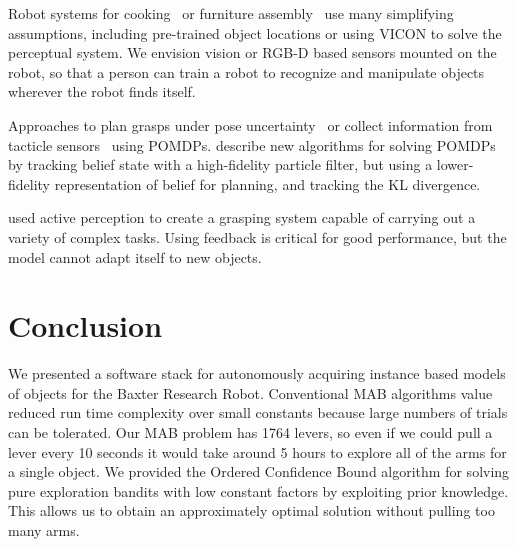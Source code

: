 \documentclass{article}
\newcommand{\stnote}[1]{\textcolor{blue}{\textbf{ST: #1}}}
\begin{document}
Robot systems for cooking~\citep{bollini12, beetz11} or furniture
assembly~\citep{knepper13} use many simplifying assumptions, including
pre-trained object locations or using VICON to solve the perceptual
system.  We envision vision or RGB-D based sensors mounted on the
robot, so that a person can train a robot to recognize and manipulate
objects wherever the robot finds itself.

Approaches to plan grasps under pose uncertainty~\citep{stulp11} or
collect information from tacticle sensors~\citep{hsiao10} using
POMDPs.  \citet{plat11} describe new algorithms for solving POMDPs by
tracking belief state with a high-fidelity particle filter, but using
a lower-fidelity representation of belief for planning, and tracking
the KL divergence.

\citet{hudson12} used active perception to create a grasping system
capable of carrying out a variety of complex tasks.  Using feedback is
critical for good performance, but the model cannot adapt itself to
new objects.



\section{Conclusion}

\label{sec:conclusion}


We presented a software stack for autonomously acquiring instance based models
of objects for the Baxter Research Robot.  Conventional MAB algorithms value
reduced run time complexity over small constants because large numbers of trials
can be tolerated.  Our MAB problem has 1764 levers, so even if we could pull a
lever every 10 seconds it would take around 5 hours to explore all of the arms
for a single object.  We provided the Ordered Confidence Bound algorithm for
solving pure exploration bandits with low constant factors by exploiting prior
knowledge.  This allows us to obtain an approximately optimal solution without
pulling too many arms.  
\end{document}
